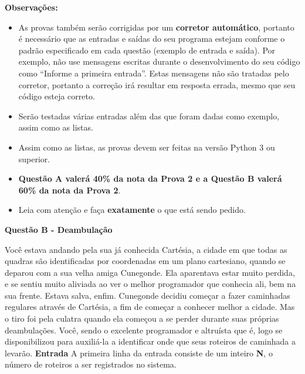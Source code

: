 \documentclass[a4paper, 12pt]{article}
\begin{document}
\textbf{{\large Observações:}}
\begin{itemize}
	\item As provas também serão corrigidas por um \textbf{corretor automático}, portanto é necessário que as entradas e saídas do seu programa estejam conforme o padrão especificado em cada questão (exemplo de entrada e saída). Por exemplo, não use mensagens escritas durante o desenvolvimento do seu código como “Informe a primeira entrada”. Estas mensagens não são tratadas pelo corretor, portanto a correção irá resultar em resposta errada, mesmo que seu código esteja correto.
	\item Serão testadas várias entradas além das que foram dadas como exemplo, assim como as listas.
	\item Assim como as listas, as provas devem ser feitas na versão Python 3 ou superior.
	\item \textbf{Questão A valerá 40\% da nota da Prova 2 e a Questão B valerá 60\% da nota da Prova 2}.
	\item Leia com atenção e faça \textbf{exatamente} o que está sendo pedido.
\end{itemize}
\newpage %
\begin{center}
\textbf{{\Large Questão B - Deambulação}}
\end{center}
\vspace{5pt}
Você estava andando pela sua já conhecida Cartésia, a cidade em que todas as
quadras são identificadas por coordenadas em um plano cartesiano, quando se
deparou com a sua velha amiga Cunegonde. \newline
Ela aparentava estar muito perdida, e se sentiu muito aliviada ao ver o melhor
programador que conhecia ali, bem na sua frente. Estava salva, enfim. \newline \newline
Cunegonde decidiu começar a fazer caminhadas regulares através de Cartésia, a
fim de começar a conhecer melhor a cidade. Mas o tiro foi pela culatra quando ela
começou a se perder durante suas próprias deambulações. Você, sendo o
excelente programador e altruísta que é, logo se disponibilizou para auxiliá-la a
identificar onde que seus roteiros de caminhada a levarão. \newline \newline
\textbf{{\large Entrada}} \newline
A primeira linha da entrada consiste de um inteiro \textbf{N}, o número de roteiros a ser
registrados no sistema. \newline
\end{document}
